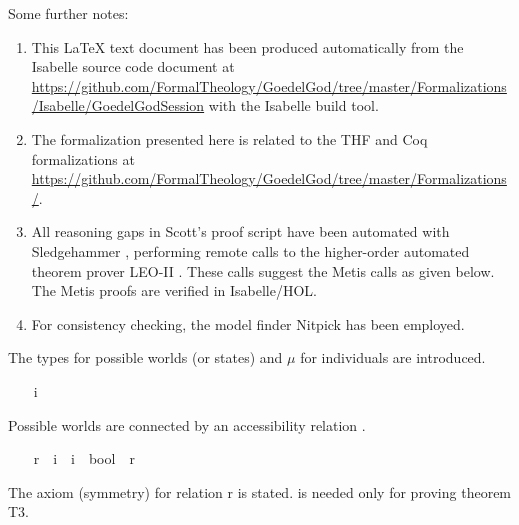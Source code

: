 \begin{isabellebody}
\begin{isamarkuptext}
 Some further notes: \sloppy
 \begin{enumerate}
 \item This LaTeX text document has been produced automatically from the Isabelle source
 code document at 
 \url{https://github.com/FormalTheology/GoedelGod/tree/master/Formalizations/Isabelle/GoedelGodSession} 
 with the Isabelle build tool.
 \item The formalization presented here is related to the THF \cite{J22} and 
    Coq \cite{Coq} formalizations at
    \url{https://github.com/FormalTheology/GoedelGod/tree/master/Formalizations/}.
 \item All reasoning gaps in Scott's proof script have been automated 
    with Sledgehammer \cite{Sledgehammer}, performing remote calls to the higher-order automated
    theorem prover LEO-II \cite{LEO-II}. These calls suggest the 
    Metis \cite{Metis} calls as given below. The Metis proofs are verified in Isabelle/HOL.
 \item For consistency checking, the model finder Nitpick \cite{Nitpick} has been employed.
 \end{enumerate}%
\end{isamarkuptext}%
\isamarkuptrue%
%
\isamarkuptrue%
%
\begin{isamarkuptext}%
The types  for possible worlds (or states) and $\mu$ for individuals 
are introduced.%
\end{isamarkuptext}%
\isamarkuptrue%
\ \ \isamarkupfalse%
\ i\ \ \ \ %
\ \isanewline
\ \ \isamarkupfalse%
\ {\isasymmu}\ \ \ \ %
%
\begin{isamarkuptext}%
Possible worlds are connected by an accessibility relation .%
\end{isamarkuptext}%
\isamarkuptrue%
\ \ \isamarkupfalse%
\ r\ {\isacharcolon}{\isacharcolon}\ {\isachardoublequoteopen}i\ {\isasymRightarrow}\ i\ {\isasymRightarrow}\ bool{\isachardoublequoteclose}\ {\isacharparenleft}\ {\isachardoublequoteopen}r{\isachardoublequoteclose}\ {}{}{\isacharparenright}\ \ \ \ %
%
\begin{isamarkuptext}%
The  axiom (symmetry) for relation r is stated.  is needed only 
for proving theorem T3.%
\end{isamarkuptext}%
\isamarkuptrue%

\end{isabellebody}
